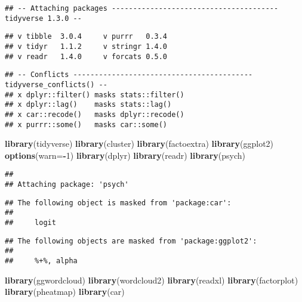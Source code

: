 \documentclass[
]{article}
\newenvironment{Shaded}{\begin{snugshade}}{\end{snugshade}}
\newcommand{\DataTypeTok}[1]{\textcolor[rgb]{0.13,0.29,0.53}{#1}}
\newcommand{\DecValTok}[1]{\textcolor[rgb]{0.00,0.00,0.81}{#1}}
\newcommand{\KeywordTok}[1]{\textcolor[rgb]{0.13,0.29,0.53}{\textbf{#1}}}
\newcommand{\NormalTok}[1]{#1}
\newcommand{\OperatorTok}[1]{\textcolor[rgb]{0.81,0.36,0.00}{\textbf{#1}}}
\begin{document}
\begin{verbatim}
## -- Attaching packages --------------------------------------- tidyverse 1.3.0 --
\end{verbatim}

\begin{verbatim}
## v tibble  3.0.4     v purrr   0.3.4
## v tidyr   1.1.2     v stringr 1.4.0
## v readr   1.4.0     v forcats 0.5.0
\end{verbatim}

\begin{verbatim}
## -- Conflicts ------------------------------------------ tidyverse_conflicts() --
## x dplyr::filter() masks stats::filter()
## x dplyr::lag()    masks stats::lag()
## x car::recode()   masks dplyr::recode()
## x purrr::some()   masks car::some()
\end{verbatim}

\begin{Shaded}
\begin{Highlighting}[]
\KeywordTok{library}\NormalTok{(tidyverse)}
\KeywordTok{library}\NormalTok{(cluster)}
\KeywordTok{library}\NormalTok{(factoextra)}
\KeywordTok{library}\NormalTok{(ggplot2)}
\KeywordTok{options}\NormalTok{(}\DataTypeTok{warn=}\OperatorTok{-}\DecValTok{1}\NormalTok{)}
\KeywordTok{library}\NormalTok{(dplyr)}
\KeywordTok{library}\NormalTok{(readr)}
\KeywordTok{library}\NormalTok{(psych)}
\end{Highlighting}
\end{Shaded}

\begin{verbatim}
## 
## Attaching package: 'psych'
\end{verbatim}

\begin{verbatim}
## The following object is masked from 'package:car':
## 
##     logit
\end{verbatim}

\begin{verbatim}
## The following objects are masked from 'package:ggplot2':
## 
##     %+%, alpha
\end{verbatim}

\begin{Shaded}
\begin{Highlighting}[]
\KeywordTok{library}\NormalTok{(ggwordcloud)}
\KeywordTok{library}\NormalTok{(wordcloud2)}
\KeywordTok{library}\NormalTok{(readxl)}
\KeywordTok{library}\NormalTok{(factorplot)}
\KeywordTok{library}\NormalTok{(pheatmap)}
\KeywordTok{library}\NormalTok{(car)}
\end{Highlighting}
\end{Shaded}
\end{document}
